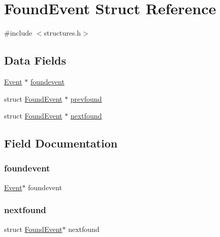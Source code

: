 \hypertarget{struct_found_event}{}\section{Found\+Event Struct Reference}
\label{struct_found_event}


{\ttfamily \#include $<$structures.\+h$>$}

\subsection*{Data Fields}
\begin{DoxyCompactItemize}
\item 
\hyperlink{struct_event}{Event} $\ast$ \hyperlink{struct_found_event_a9fb10dd8687d775ac50c8824bde19d67}{foundevent}
\item 
struct \hyperlink{struct_found_event}{Found\+Event} $\ast$ \hyperlink{struct_found_event_add29159b298db5eb8c68bd9314e7c498}{prevfound}
\item 
struct \hyperlink{struct_found_event}{Found\+Event} $\ast$ \hyperlink{struct_found_event_acbce65ffd090e8c5d45aa15b2ccdf453}{nextfound}
\end{DoxyCompactItemize}


\subsection{Field Documentation}
\mbox{\label{struct_found_event_a9fb10dd8687d775ac50c8824bde19d67}} 
\subsubsection{\texorpdfstring{foundevent}{foundevent}}
{\footnotesize\ttfamily \hyperlink{struct_event}{Event}$\ast$ foundevent}

\mbox{\label{struct_found_event_acbce65ffd090e8c5d45aa15b2ccdf453}} 
\subsubsection{\texorpdfstring{nextfound}{nextfound}}
{\footnotesize\ttfamily struct \hyperlink{struct_found_event}{Found\+Event}$\ast$ nextfound}

